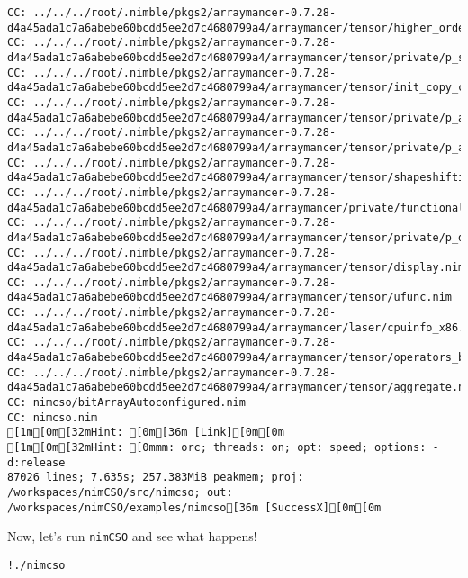 \begin{verbatim}
CC: ../../../root/.nimble/pkgs2/arraymancer-0.7.28-d4a45ada1c7a6abebe60bcdd5ee2d7c4680799a4/arraymancer/tensor/higher_order_applymap.nim
CC: ../../../root/.nimble/pkgs2/arraymancer-0.7.28-d4a45ada1c7a6abebe60bcdd5ee2d7c4680799a4/arraymancer/tensor/private/p_shapeshifting.nim
CC: ../../../root/.nimble/pkgs2/arraymancer-0.7.28-d4a45ada1c7a6abebe60bcdd5ee2d7c4680799a4/arraymancer/tensor/init_copy_cpu.nim
CC: ../../../root/.nimble/pkgs2/arraymancer-0.7.28-d4a45ada1c7a6abebe60bcdd5ee2d7c4680799a4/arraymancer/tensor/private/p_accessors_macros_read.nim
CC: ../../../root/.nimble/pkgs2/arraymancer-0.7.28-d4a45ada1c7a6abebe60bcdd5ee2d7c4680799a4/arraymancer/tensor/private/p_accessors_macros_write.nim
CC: ../../../root/.nimble/pkgs2/arraymancer-0.7.28-d4a45ada1c7a6abebe60bcdd5ee2d7c4680799a4/arraymancer/tensor/shapeshifting.nim
CC: ../../../root/.nimble/pkgs2/arraymancer-0.7.28-d4a45ada1c7a6abebe60bcdd5ee2d7c4680799a4/arraymancer/private/functional.nim
CC: ../../../root/.nimble/pkgs2/arraymancer-0.7.28-d4a45ada1c7a6abebe60bcdd5ee2d7c4680799a4/arraymancer/tensor/private/p_display.nim
CC: ../../../root/.nimble/pkgs2/arraymancer-0.7.28-d4a45ada1c7a6abebe60bcdd5ee2d7c4680799a4/arraymancer/tensor/display.nim
CC: ../../../root/.nimble/pkgs2/arraymancer-0.7.28-d4a45ada1c7a6abebe60bcdd5ee2d7c4680799a4/arraymancer/tensor/ufunc.nim
CC: ../../../root/.nimble/pkgs2/arraymancer-0.7.28-d4a45ada1c7a6abebe60bcdd5ee2d7c4680799a4/arraymancer/laser/cpuinfo_x86.nim
CC: ../../../root/.nimble/pkgs2/arraymancer-0.7.28-d4a45ada1c7a6abebe60bcdd5ee2d7c4680799a4/arraymancer/tensor/operators_broadcasted.nim
CC: ../../../root/.nimble/pkgs2/arraymancer-0.7.28-d4a45ada1c7a6abebe60bcdd5ee2d7c4680799a4/arraymancer/tensor/aggregate.nim
CC: nimcso/bitArrayAutoconfigured.nim
CC: nimcso.nim
[1m[0m[32mHint: [0m[36m [Link][0m[0m
[1m[0m[32mHint: [0mmm: orc; threads: on; opt: speed; options: -d:release
87026 lines; 7.635s; 257.383MiB peakmem; proj: /workspaces/nimCSO/src/nimcso; out: /workspaces/nimCSO/examples/nimcso[36m [SuccessX][0m[0m
\end{verbatim}

Now, let's run \texttt{nimCSO} and see what happens!

\begin{verbatim}
!./nimcso
\end{verbatim}

